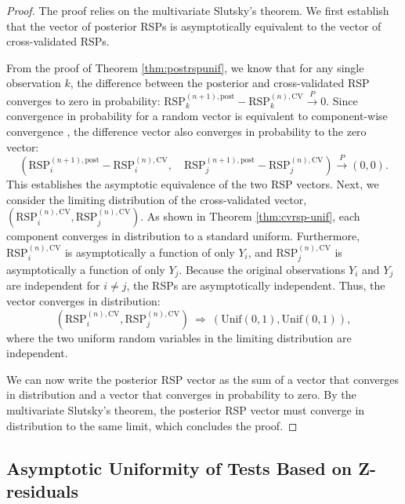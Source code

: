 \documentclass[
  12pt]{article}
\theoremstyle{plain}
\theoremstyle{definition}
\theoremstyle{remark}
\begin{document}
\begin{proof}
The proof relies on the multivariate Slutsky's theorem. We first establish that the vector of posterior RSPs is asymptotically equivalent to the vector of cross-validated RSPs.

From the proof of Theorem \ref{thm:postrspunif}, we know that for any single observation $k$, the difference between the posterior and cross-validated RSP converges to zero in probability: $\mathrm{RSP}_k^{(n+1),\mathrm{post}} - \mathrm{RSP}_k^{(n),\mathrm{CV}} \xrightarrow{P} 0$. Since convergence in probability for a random vector is equivalent to component-wise convergence \citep{shao2008}, the difference vector also converges in probability to the zero vector:
\begin{equation}\left( \mathrm{RSP}_i^{(n+1),\mathrm{post}} - \mathrm{RSP}_i^{(n),\mathrm{CV}}, \quad \mathrm{RSP}_j^{(n+1),\mathrm{post}} - \mathrm{RSP}_j^{(n),\mathrm{CV}} \right) \xrightarrow{P} (0,0).\end{equation}
This establishes the asymptotic equivalence of the two RSP vectors. Next, we consider the limiting distribution of the cross-validated vector, $(\mathrm{RSP}_i^{(n),\mathrm{CV}}, \mathrm{RSP}_j^{(n),\mathrm{CV}})$. As shown in Theorem \ref{thm:cvrsp-unif}, each component converges in distribution to a standard uniform. Furthermore, $\mathrm{RSP}_i^{(n),\mathrm{CV}}$ is asymptotically a function of only $Y_i$, and $\mathrm{RSP}_j^{(n),\mathrm{CV}}$ is asymptotically a function of only $Y_j$. Because the original observations $Y_i$ and $Y_j$ are independent for $i \neq j$, the RSPs are asymptotically independent. Thus, the vector converges in distribution:
\begin{equation}(\mathrm{RSP}_i^{(n),\mathrm{CV}}, \mathrm{RSP}_j^{(n),\mathrm{CV}}) \ \Rightarrow\ (\mathrm{Unif}(0,1), \mathrm{Unif}(0,1)),
\end{equation}
where the two uniform random variables in the limiting distribution are independent.

We can now write the posterior RSP vector as the sum of a vector that converges in distribution and a vector that converges in probability to zero. By the multivariate Slutsky's theorem, the posterior RSP vector must converge in distribution to the same limit, which concludes the proof.
\end{proof}

\subsection{Asymptotic Uniformity of Tests Based on Z-residuals}
\end{document}
